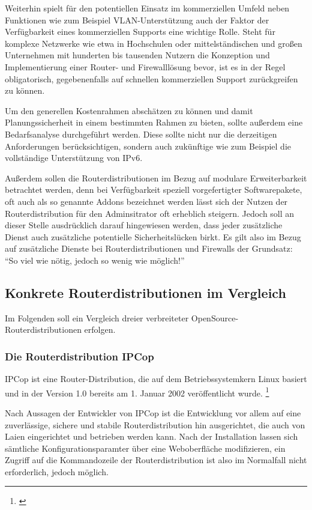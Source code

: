 \documentclass[a4paper,12pt]{scrartcl}
\begin{document}
Weiterhin spielt f\"ur den potentiellen Einsatz im kommerziellen Umfeld
neben Funktionen wie zum Beispiel VLAN-Unterst\"utzung auch der Faktor der
Verf\"ugbarkeit eines kommerziellen Supports eine wichtige Rolle. Steht f\"ur
komplexe Netzwerke wie etwa in Hochschulen oder mittelst\"andischen und
gro\ss{}en Unternehmen mit hunderten bis tausenden Nutzern die Konzeption und
Implementierung einer Router- und Firewalll\"osung bevor, ist es in der Regel
obligatorisch, gegebenenfalls auf schnellen kommerziellen Support
zur\"uckgreifen zu k\"onnen.

Um den generellen Kostenrahmen absch\"atzen zu k\"onnen und damit
Planungssicherheit in einem bestimmten Rahmen zu bieten, sollte au\ss{}erdem
eine Bedarfsanalyse durchgef\"uhrt werden. Diese sollte nicht nur die
derzeitigen Anforderungen ber\"ucksichtigen, sondern auch zuk\"unftige wie zum
Beispiel die vollst\"andige Unterst\"utzung von IPv6.

Au\ss{}erdem sollen die Routerdistributionen im Bezug auf modulare
Erweiterbarkeit betrachtet werden, denn bei Verf\"ugbarkeit speziell
vorgefertigter Softwarepakete, oft auch als so genannte Addons bezeichnet
werden l\"asst sich der Nutzen der Routerdistribution f\"ur den Adminsitrator
oft erheblich steigern. Jedoch soll an dieser Stelle ausdr\"ucklich darauf
hingewiesen werden, dass jeder zus\"atzliche Dienst auch zus\"atzliche
potentielle Sicherheitsl\"ucken birkt. Es gilt also im Bezug auf zus\"atzliche
Dienste bei Routerdistributionen und Firewalls der Grundsatz: ``So viel wie
n\"otig, jedoch so wenig wie m\"oglich!''
 
\subsection{Konkrete Routerdistributionen im Vergleich}
Im Folgenden soll ein Vergleich dreier verbreiteter OpenSource-
Routerdistributionen erfolgen. 

\subsubsection{Die Routerdistribution IPCop}
IPCop ist eine Router-Distribution, die auf dem Betriebssystemkern Linux
basiert und in der Version 1.0 bereits am 1. Januar 2002 ver\"offentlicht
wurde. \footnote{\cite{IPCopManual}}

Nach Aussagen der Entwickler von IPCop ist die Entwicklung vor allem auf eine
zuverl\"assige, sichere und stabile Routerdistribution hin ausgerichtet, die
auch von Laien eingerichtet und betrieben werden kann. Nach der Installation
lassen sich s\"amtliche Konfigurationsparamter \"uber eine Weboberfl\"ache
modifizieren, ein Zugriff auf die Kommandozeile der Routerdistribution ist also
im Normalfall nicht erforderlich, jedoch m\"oglich. 
\end{document}
